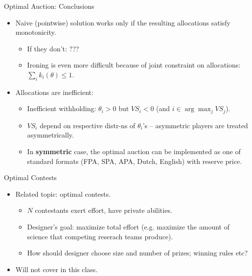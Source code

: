 \documentclass[english,10pt
,aspectratio=169
]{beamer}
\begin{document}
\begin{frame}{Optimal Auction: Conclusions}
\begin{itemize}
	\item Naive (pointwise) solution works only if the resulting allocations satisfy monotonicity.
	\begin{itemize}
		\item If they don't: ???
		\item Ironing is even more difficult because of joint constraint on allocations: $\sum_i k_i (\theta) \leq 1$.
	\end{itemize}
	\item Allocations are inefficient:
	\begin{itemize}
		\item Inefficient withholding: $\theta_i > 0$ but $VS_i < 0$ (and $i \in \arg \max_j VS_j$).
		\item $VS_i$ depend on respective distr-ns of $\theta_i$'s -- asymmetric players are treated asymmetrically.
		\item In \textbf{symmetric} case, the optimal auction can be implemented as one of standard formats (FPA, SPA, APA, Dutch, English) with reserve price.
	\end{itemize}
\end{itemize}
\end{frame}


\begin{frame}{Optimal Contests}
\begin{itemize}
	\item Related topic: optimal contests.
	\begin{itemize}
		\item $N$ contestants exert effort, have private abilities.
		\item Designer's goal: maximize total effort (e.g. maximize the amount of science that competing reserach teams produce).
		\item How should designer choose size and number of prizes; winning rules etc? 
	\end{itemize}
	\item Will not cover in this class.
\end{itemize}
\end{frame}
\end{document}
